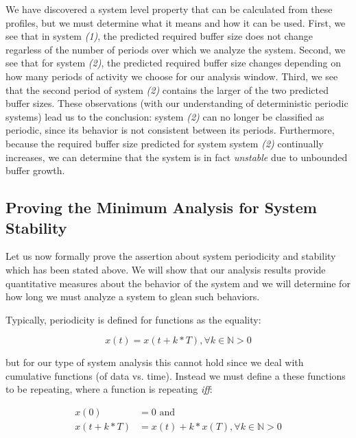 We have discovered a system level property that can be calculated from
these profiles, but we must determine what it means and how it can be
used.  First, we see that in system \emph{(1)}, the predicted required
buffer size does not change regarless of the number of periods over
which we analyze the system.  Second, we see that for system \emph{(2)},
the predicted required buffer size changes depending on how many
periods of activity we choose for our analysis window.  Third, we see
that the second period of system \emph{(2)} contains the larger of the two
predicted buffer sizes.  These observations (with our understanding of
deterministic periodic systems) lead us to the conclusion: system
\emph{(2)} can no longer be classified as periodic, since its behavior is
not consistent between its periods.  Furthermore, because the required
buffer size predicted for system system \emph{(2)} continually increases,
we can determine that the system is in fact \emph{unstable} due to
unbounded buffer growth.

\subsection{Proving the Minimum Analysis for System Stability}
\label{subsec:periodic_proof}

Let us now formally prove the assertion about system periodicity and
stability which has been stated above.  We will show that our analysis
results provide quantitative measures about the behavior of the system
and we will determine for how long we must analyze a system to glean
such behaviors.

Typically, periodicity is defined for functions as the equality:

\begin{equation}
  x(t) = x(t + k * T), \forall k \in \mathbb{N} > 0
\end{equation}

but for our type of system analysis this cannot hold since we deal
with cumulative functions (of data vs. time).  Instead we must define
a these functions to be repeating, where a function is repeating
\emph{iff}:

\begin{equation}
  \begin{split}
    x(0) &= 0 \text{  and}\\
    x(t + k * T) &= x(t) + k * x(T), \forall k \in \mathbb{N} > 0
  \end{split}
\end{equation}

